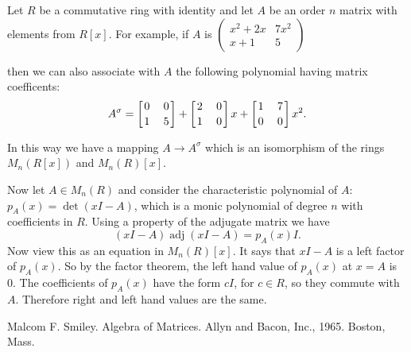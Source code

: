 \documentclass[12pt]{article}
\begin{document}
Let $R$ be a commutative ring with identity and let $A$ be an order $n$ matrix
with elements from $R[x]$. 
For example, if $A$ is
$\begin{pmatrix}
x^2+2x & 7x^2 \\
x+1 & 5
\end{pmatrix}$

then we can also associate with $A$ the following polynomial having matrix coefficents:
\begin{displaymath}
A^\sigma = \left[ {0 \atop 1}\quad {0 \atop 5} \right] + \left[{2 \atop 1 } \quad{ 0 \atop 0} \right]x + \left[ {1 \atop 0 } \quad{ 7 \atop 0 } \right]x^2 .
\end{displaymath}

In this way we have a mapping $A\longrightarrow A^\sigma$ which is an isomorphism of the rings $M_{n}(R[x])$ and $M_{n}(R)[x]$. 

Now let $A \in M_{n}(R)$ and 
consider the characteristic polynomial of $A$: $p_{A}(x) = \det(xI - A)$, which is a monic
polynomial of degree $n$ with coefficients in $R$. 
Using a property of the adjugate matrix we have
$$(xI-A)\operatorname{adj}(xI-A) = p_{A}(x)I.$$
Now view this as an equation in $M_{n}(R)[x]$. It says that $xI-A$ is a left factor
of $p_{A}(x)$. So by the factor theorem, the left hand value of $p_{A}(x)$ 
at $x=A$ is 0. The coefficients of $p_{A}(x)$ have the form $cI$, for $c\in R$,
so they commute with $A$. Therefore right and left hand values are the same.

\begin{thebibliography}{9}
 Malcom F. Smiley. Algebra of Matrices. Allyn and Bacon, Inc., 1965. Boston, Mass. 
\end{thebibliography}

\end{document}
